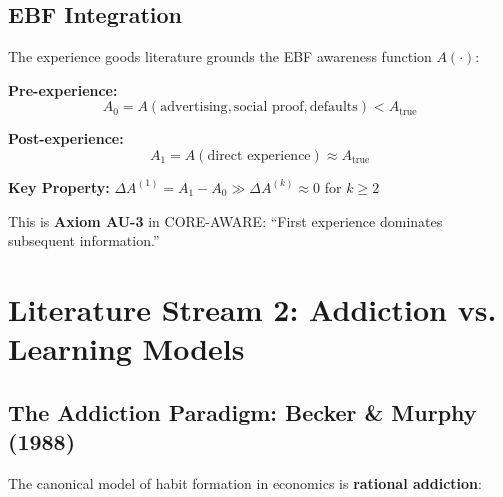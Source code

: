 \documentclass[11pt, a4paper]{article}
\begin{document}
\subsection{EBF Integration}

\begin{tcolorbox}[colback=green!5!white, colframe=green!75!black,
    title=Experience Goods $\rightarrow$ CORE-AWARE]

The experience goods literature grounds the EBF awareness function $A(\cdot)$:

\textbf{Pre-experience:}
\begin{equation}
A_0 = A(\text{advertising}, \text{social proof}, \text{defaults}) < A_{\text{true}}
\end{equation}

\textbf{Post-experience:}
\begin{equation}
A_1 = A(\text{direct experience}) \approx A_{\text{true}}
\end{equation}

\textbf{Key Property:} $\Delta A^{(1)} = A_1 - A_0 \gg \Delta A^{(k)} \approx 0$ for $k \geq 2$

This is \textbf{Axiom AU-3} in CORE-AWARE: ``First experience dominates subsequent information.''

\end{tcolorbox}


\section{Literature Stream 2: Addiction vs. Learning Models}
\label{sec:lrn-addiction-vs-learning}

\subsection{The Addiction Paradigm: Becker \& Murphy (1988)}

The canonical model of habit formation in economics is \textbf{rational addiction}:
\end{document}

